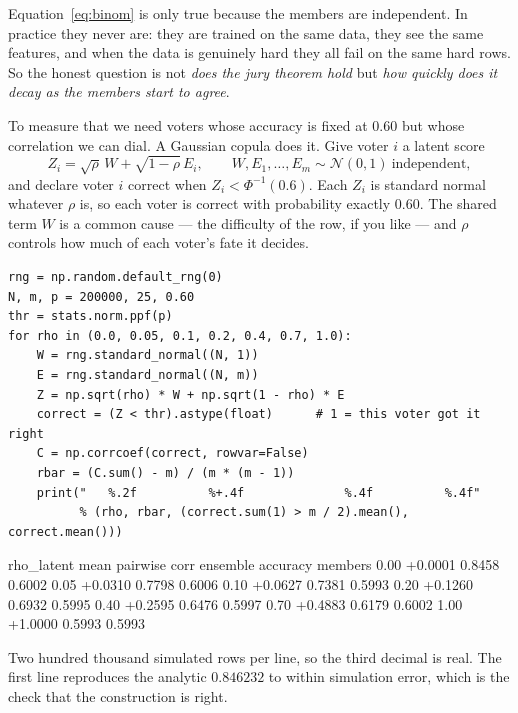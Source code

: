 \documentclass[11pt]{article}
\begin{document}
Equation~\eqref{eq:binom} is only true because the members are independent. In
practice they never are: they are trained on the same data, they see the same
features, and when the data is genuinely hard they all fail on the same hard
rows. So the honest question is not \emph{does the jury theorem hold} but
\emph{how quickly does it decay as the members start to agree}.

To measure that we need voters whose accuracy is fixed at $0.60$ but whose
correlation we can dial. A Gaussian copula does it. Give voter $i$ a latent
score
\[
  Z_i = \sqrt{\rho}\,W + \sqrt{1 - \rho}\,E_i,
  \qquad W, E_1, \dots, E_m \sim \mathcal{N}(0,1)
  \ \text{independent},
\]
and declare voter $i$ correct when $Z_i < \Phi^{-1}(0.6)$. Each $Z_i$ is
standard normal whatever $\rho$ is, so each voter is correct with probability
exactly $0.60$. The shared term $W$ is a common cause --- the difficulty of the
row, if you like --- and $\rho$ controls how much of each voter's fate it
decides.

\begin{lstlisting}
rng = np.random.default_rng(0)
N, m, p = 200000, 25, 0.60
thr = stats.norm.ppf(p)
for rho in (0.0, 0.05, 0.1, 0.2, 0.4, 0.7, 1.0):
    W = rng.standard_normal((N, 1))
    E = rng.standard_normal((N, m))
    Z = np.sqrt(rho) * W + np.sqrt(1 - rho) * E
    correct = (Z < thr).astype(float)      # 1 = this voter got it right
    C = np.corrcoef(correct, rowvar=False)
    rbar = (C.sum() - m) / (m * (m - 1))
    print("   %.2f          %+.4f              %.4f          %.4f"
          % (rho, rbar, (correct.sum(1) > m / 2).mean(), correct.mean()))
\end{lstlisting}
\begin{codeout}
 rho_latent  mean pairwise corr   ensemble accuracy   members
   0.00          +0.0001              0.8458          0.6002
   0.05          +0.0310              0.7798          0.6006
   0.10          +0.0627              0.7381          0.5993
   0.20          +0.1260              0.6932          0.5995
   0.40          +0.2595              0.6476          0.5997
   0.70          +0.4883              0.6179          0.6002
   1.00          +1.0000              0.5993          0.5993
\end{codeout}

Two hundred thousand simulated rows per line, so the third decimal is real.
The first line reproduces the analytic $0.846232$ to within simulation error,
which is the check that the construction is right.
\end{document}
